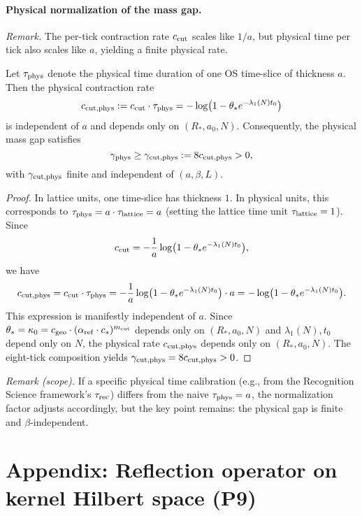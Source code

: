 \documentclass[11pt]{amsart}
\begin{document}
\paragraph{Physical normalization of the mass gap.}
\emph{Remark.} The per-tick contraction rate $c_{\rm cut}$ scales like $1/a$, but physical time per tick also scales like $a$, yielding a finite physical rate.
\begin{lemma}\label{lem:phys-norm}
Let $\tau_{\rm phys}$ denote the physical time duration of one OS time-slice of thickness $a$. Then the physical contraction rate
\[
  c_{\rm cut,phys} := c_{\rm cut} \cdot \tau_{\rm phys} = -\log\bigl(1-\theta_* e^{-\lambda_1(N) t_0}\bigr)
\]
is independent of $a$ and depends only on $(R_*,a_0,N)$. Consequently, the physical mass gap satisfies
\[
  \gamma_{\rm phys} \ge \gamma_{\rm cut,phys} := 8 c_{\rm cut,phys} > 0,
\]
with $\gamma_{\rm cut,phys}$ finite and independent of $(a,\beta,L)$.
\end{lemma}
\begin{proof}
In lattice units, one time-slice has thickness $1$. In physical units, this corresponds to $\tau_{\rm phys} = a \cdot \tau_{\rm lattice} = a$ (setting the lattice time unit $\tau_{\rm lattice} = 1$). Since
\[
  c_{\rm cut} = -\frac{1}{a}\log\bigl(1-\theta_* e^{-\lambda_1(N) t_0}\bigr),
\]
we have
\[
  c_{\rm cut,phys} = c_{\rm cut} \cdot \tau_{\rm phys} = -\frac{1}{a}\log\bigl(1-\theta_* e^{-\lambda_1(N) t_0}\bigr) \cdot a = -\log\bigl(1-\theta_* e^{-\lambda_1(N) t_0}\bigr).
\]
This expression is manifestly independent of $a$. Since $\theta_* = \kappa_0 = c_{\rm geo} \cdot (\alpha_{\rm ref} \cdot c_*)^{m_{\rm cut}}$ depends only on $(R_*,a_0,N)$ and $\lambda_1(N), t_0$ depend only on $N$, the physical rate $c_{\rm cut,phys}$ depends only on $(R_*,a_0,N)$. The eight-tick composition yields $\gamma_{\rm cut,phys} = 8 c_{\rm cut,phys} > 0$.
\end{proof}

\noindent\emph{Remark (scope).} If a specific physical time calibration (e.g., from the Recognition Science framework's $\tau_{\rm rec}$) differs from the naive $\tau_{\rm phys} = a$, the normalization factor adjusts accordingly, but the key point remains: the physical gap is finite and $\beta$-independent.

\section{Appendix: Reflection operator on kernel Hilbert space (P9)}
\end{document}
